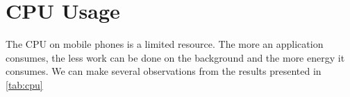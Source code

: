 \documentclass{kththesis}
\begin{document}



\section{CPU Usage}

The CPU on mobile phones is a limited resource. The more an application consumes, the less work can be done on the background and the more energy it consumes. We can make several observations from the results presented in \autoref{tab:cpu}  
\end{document}
